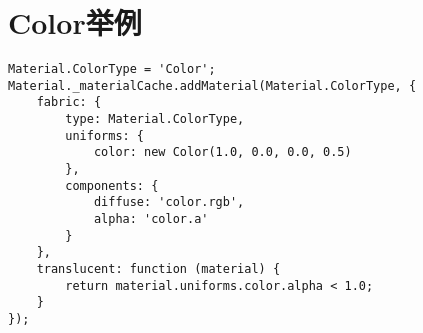 \section{Color举例}
\begin{lstlisting}
Material.ColorType = 'Color';
Material._materialCache.addMaterial(Material.ColorType, {
    fabric: {
        type: Material.ColorType,
        uniforms: {
            color: new Color(1.0, 0.0, 0.0, 0.5)
        },
        components: {
            diffuse: 'color.rgb',
            alpha: 'color.a'
        }
    },
    translucent: function (material) {
        return material.uniforms.color.alpha < 1.0;
    }
});
\end{lstlisting}  
